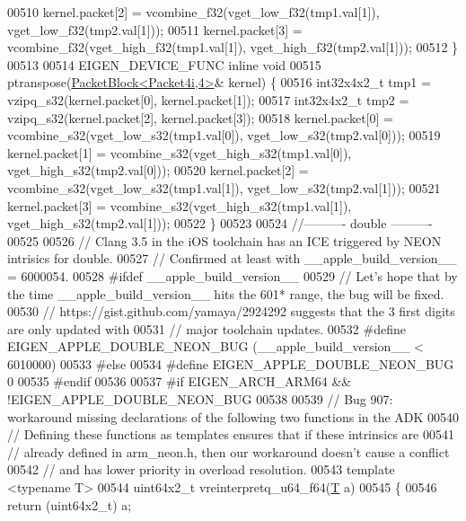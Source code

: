 \begin{DoxyCode}
{{00510   kernel.packet[2] = vcombine\_f32(vget\_low\_f32(tmp1.val[1]), vget\_low\_f32(tmp2.val[1]));
00511   kernel.packet[3] = vcombine\_f32(vget\_high\_f32(tmp1.val[1]), vget\_high\_f32(tmp2.val[1]));
00512 \}
00513 
00514 EIGEN\_DEVICE\_FUNC \textcolor{keyword}{inline} \textcolor{keywordtype}{void}
00515 ptranspose(\hyperlink{struct_eigen_1_1internal_1_1_packet_block}{PacketBlock<Packet4i,4>}& kernel) \{
00516   int32x4x2\_t tmp1 = vzipq\_s32(kernel.packet[0], kernel.packet[1]);
00517   int32x4x2\_t tmp2 = vzipq\_s32(kernel.packet[2], kernel.packet[3]);
00518   kernel.packet[0] = vcombine\_s32(vget\_low\_s32(tmp1.val[0]), vget\_low\_s32(tmp2.val[0]));
00519   kernel.packet[1] = vcombine\_s32(vget\_high\_s32(tmp1.val[0]), vget\_high\_s32(tmp2.val[0]));
00520   kernel.packet[2] = vcombine\_s32(vget\_low\_s32(tmp1.val[1]), vget\_low\_s32(tmp2.val[1]));
00521   kernel.packet[3] = vcombine\_s32(vget\_high\_s32(tmp1.val[1]), vget\_high\_s32(tmp2.val[1]));
00522 \}
00523 
00524 \textcolor{comment}{//---------- double ----------}
00525 
00526 \textcolor{comment}{// Clang 3.5 in the iOS toolchain has an ICE triggered by NEON intrisics for double.}
00527 \textcolor{comment}{// Confirmed at least with \_\_apple\_build\_version\_\_ = 6000054.}
00528 \textcolor{preprocessor}{#ifdef \_\_apple\_build\_version\_\_}
00529 \textcolor{comment}{// Let's hope that by the time \_\_apple\_build\_version\_\_ hits the 601* range, the bug will be fixed.}
00530 \textcolor{comment}{// https://gist.github.com/yamaya/2924292 suggests that the 3 first digits are only updated with}
00531 \textcolor{comment}{// major toolchain updates.}
00532 \textcolor{preprocessor}{#define EIGEN\_APPLE\_DOUBLE\_NEON\_BUG (\_\_apple\_build\_version\_\_ < 6010000)}
00533 \textcolor{preprocessor}{#else}
00534 \textcolor{preprocessor}{#define EIGEN\_APPLE\_DOUBLE\_NEON\_BUG 0}
00535 \textcolor{preprocessor}{#endif}
00536 
00537 \textcolor{preprocessor}{#if EIGEN\_ARCH\_ARM64 && !EIGEN\_APPLE\_DOUBLE\_NEON\_BUG}
00538 
00539 \textcolor{comment}{// Bug 907: workaround missing declarations of the following two functions in the ADK}
00540 \textcolor{comment}{// Defining these functions as templates ensures that if these intrinsics are}
00541 \textcolor{comment}{// already defined in arm\_neon.h, then our workaround doesn't cause a conflict}
00542 \textcolor{comment}{// and has lower priority in overload resolution.}
00543 \textcolor{keyword}{template} <\textcolor{keyword}{typename} T>
00544 uint64x2\_t vreinterpretq\_u64\_f64(\hyperlink{group___sparse_core___module}{T} a)
00545 \{
00546   \textcolor{keywordflow}{return} (uint64x2\_t) a;
}}
\end{DoxyCode}
